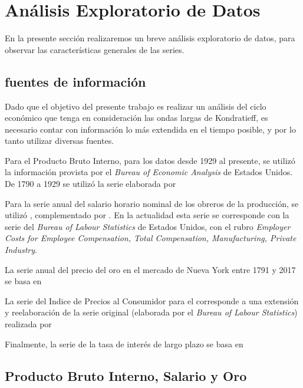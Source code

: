 \documentclass[a4paper]{article}
\begin{document}
\section{Análisis Exploratorio de Datos}
En la presente sección realizaremos un breve análisis exploratorio de datos, para observar las características generales de las series.


\subsection{fuentes de información}

Dado que el objetivo del presente trabajo es realizar un análisis del ciclo económico que tenga en consideración las ondas largas de Kondratieff, es necesario contar con información lo más extendida en el tiempo posible, y por lo tanto utilizar diversas fuentes. 

Para el Producto Bruto Interno, para los datos desde 1929 al presente, se utilizó la información provista por el \textit{Bureau of Economic Analysis} de Estados Unidos. De 1790 a 1929 se utilizó la serie elaborada por \cite{johnston2018us}

Para la serie anual del salario horario nominal de los obreros de la producción, se utilizó \citep{officer2009two}, complementado por \cite{officer2018wage}. En la actualidad esta serie se corresponde con la serie del \textit{Bureau of Labour Statistics} de Estados Unidos, con el rubro \textit{Employer Costs for Employee Compensation, Total Compensation, Manufacturing, Private Industry}.

La serie anual del precio del oro en el mercado de Nueva York entre 1791 y 2017 se basa en \cite{officer2018gold}

La serie del Indice de Precios al Consumidor para el corresponde a una extensión y reelaboración de la serie original (elaborada por el \textit{Bureau of Labour Statistics}) realizada por \cite{officer2018cpi}

Finalmente, la serie de la tasa de interés de largo plazo se basa en \cite{officer2018ir}

\subsection{Producto Bruto Interno, Salario y Oro}

\end{document}
